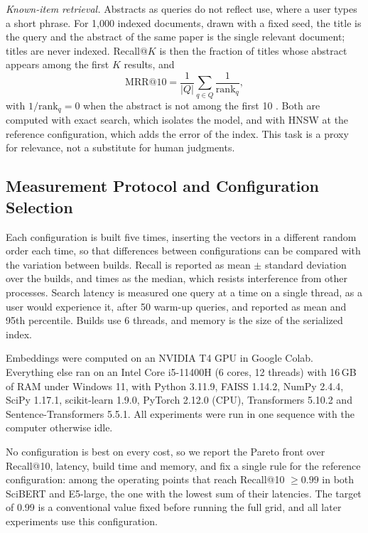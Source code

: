 \documentclass[conference, letterpaper]{IEEEtran}
\begin{document}
\textit{Known-item retrieval.} Abstracts as queries do not reflect use, where a user types a short phrase. For 1,000 indexed documents, drawn with a fixed seed, the title is the query and the abstract of the same paper is the single relevant document; titles are never indexed. Recall@$K$ is then the fraction of titles whose abstract appears among the first $K$ results, and
\begin{equation}
\mathrm{MRR@}10 = \frac{1}{|Q|}\sum_{q \in Q} \frac{1}{\mathrm{rank}_q},
\label{eq:mrr}
\end{equation}
with $1/\mathrm{rank}_q = 0$ when the abstract is not among the first 10 \cite{manning2008}. Both are computed with exact search, which isolates the model, and with HNSW at the reference configuration, which adds the error of the index. This task is a proxy for relevance, not a substitute for human judgments.

\subsection{Measurement Protocol and Configuration Selection}

Each configuration is built five times, inserting the vectors in a different random order each time, so that differences between configurations can be compared with the variation between builds. Recall is reported as mean $\pm$ standard deviation over the builds, and times as the median, which resists interference from other processes. Search latency is measured one query at a time on a single thread, as a user would experience it, after 50 warm-up queries, and reported as mean and 95th percentile. Builds use 6 threads, and memory is the size of the serialized index.

Embeddings were computed on an NVIDIA T4 GPU in Google Colab. Everything else ran on an Intel Core i5-11400H (6 cores, 12 threads) with 16\,GB of RAM under Windows 11, with Python 3.11.9, FAISS 1.14.2, NumPy 2.4.4, SciPy 1.17.1, scikit-learn 1.9.0, PyTorch 2.12.0 (CPU), Transformers 5.10.2 and Sentence-Transformers 5.5.1. All experiments were run in one sequence with the computer otherwise idle.

No configuration is best on every cost, so we report the Pareto front over Recall@10, latency, build time and memory, and fix a single rule for the reference configuration: among the operating points that reach Recall@10 $\geq 0.99$ in both SciBERT and E5-large, the one with the lowest sum of their latencies. The target of 0.99 is a conventional value fixed before running the full grid, and all later experiments use this configuration.
\end{document}
